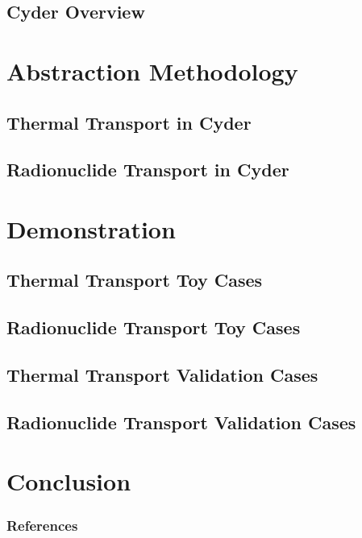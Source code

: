 \documentclass[9pt]{beamer}
\begin{document}
\subsection{Cyder Overview}

%
%

\section{Abstraction Methodology}

\subsection{Thermal Transport in Cyder}

\subsection{Radionuclide Transport in Cyder}


\section{Demonstration}

\subsection{Thermal Transport Toy Cases}

\subsection{Radionuclide Transport Toy Cases}

\subsection{Thermal Transport Validation Cases}

\subsection{Radionuclide Transport Validation Cases}


\section{Conclusion}

\begin{frame}[allowframebreaks]
  \frametitle{References}
  
  {\footnotesize  }

\end{frame}

\end{document}
